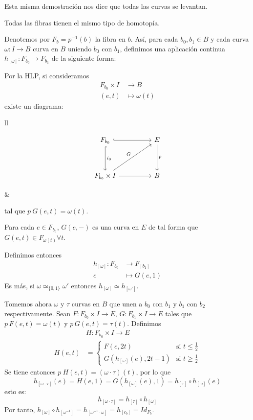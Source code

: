 Esta misma demostración nos dice que todas las curvas se levantan.
\begin{teor}
Todas las fibras tienen el mismo tipo de homotopía.
\end{teor}
\begin{demo}
Denotemos por $F_b = p^{-1}(b)$ la fibra en $b$. Así, para cada $b_0, b_1 \in B$ y cada curva $\omega : I \longrightarrow B$ curva en $B$ uniendo $b_0$ con $b_1$, definimos una aplicación continua $h_{[\omega]} : F_{b_0} \longrightarrow F_{b_1}$ de la siguiente forma: \par 
Por la HLP, si consideramos 
\begin{align*}
F_{b_0} \times I &\longrightarrow B \\
(e, t) &\longmapsto \omega(t)
\end{align*}
existe un diagrama: \par
\begin{tabular}{ll}
\begin{minipage}{0.5\textwidth}
\[
\begin{tikzcd}
F_{b_0} \arrow[hook]{rr} \arrow[hook]{dd}{i_0} & & E \arrow{dd}{p} \\
\\
F_{b_0} \times I \arrow{rr} \arrow{uurr}{G} & & B
\end{tikzcd}
\]
\end{minipage}
&
\begin{minipage}{0.5\textwidth}
tal que $p \: G(e,t) = \omega(t)$.
\end{minipage}
\end{tabular}
Para cada $e \in F_{b_0}$, $G(e,-)$ es una curva en $E$ de tal forma que $G(e,t) \in F_{\omega(t)} \forall t$. \par
Definimos entonces
\begin{align*}
h_{[\omega]} : F_{b_0} &\longrightarrow F_{[b_1]} \\
e &\longmapsto G(e,1)
\end{align*}
Es más, si $\omega \simeq_{\{0,1\}} \omega'$ entonces $h_{[\omega]} \simeq h_{[\omega']}$. \par
Tomemos ahora $\omega$ y $\tau$ curvas en $B$ que unen a $b_0$ con $b_1$ y $b_1$ con $b_2$ respectivamente. Sean $F : F_{b_0} \times I \longrightarrow E$, $G: F_{b_1} \times I \longrightarrow E$ tales que $p \, F(e,t) = \omega(t)$ y $p \, G(e,t) = \tau(t)$. Definimos
\begin{align*}
& H : F_{b_0} \times I \longrightarrow E \\
H(e,t) &= \begin{cases}
F(e, 2t) & \text{si } t \leq \frac{1}{2} \\
G(h_{[\omega]}(e), 2t -1) & \text{si } t \geq \frac{1}{2}
\end{cases}
\end{align*}
Se tiene entonces $p \: H(e,t) = (\omega \cdotp \tau)(t)$, por lo que 
\[
h_{[\omega \cdotp \tau]} (e) = H(e,1) = G(h_{[\omega]}(e), 1) = 
h_{[\tau]} \circ h_{[\omega]}(e)
\]
esto es:
\[ h_{[\omega \cdotp \tau]} = h_{[\tau]} \circ h_{[\omega]} \]
Por tanto, $h_{[\omega]} \circ h_{[\omega^{-1}]} = h_{[\omega^{-1} \cdotp \omega]} = h_{[c_b]} = Id_{F_b}$.
\end{demo}
